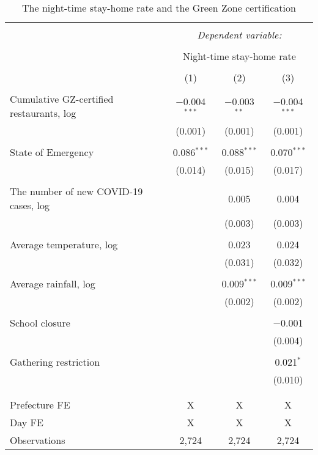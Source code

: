 
\begin{table}[H] \centering 
  \caption{The night-time stay-home rate and the Green Zone certification} 
  \label{} 
\footnotesize 
\begin{tabular}{@{\extracolsep{1pt}}lccc} 
\\[-1.8ex]\hline 
\hline \\[-1.8ex] 
 & \multicolumn{3}{c}{\textit{Dependent variable:}} \\ 
\cline{2-4} 
\\[-1.8ex] & \multicolumn{3}{c}{Night-time stay-home rate} \\ 
\\[-1.8ex] & (1) & (2) & (3)\\ 
\hline \\[-1.8ex] 
 Cumulative GZ-certified restaurants, log & $-$0.004$^{***}$ & $-$0.003$^{**}$ & $-$0.004$^{***}$ \\ 
  & (0.001) & (0.001) & (0.001) \\ 
  & & & \\ 
 State of Emergency & 0.086$^{***}$ & 0.088$^{***}$ & 0.070$^{***}$ \\ 
  & (0.014) & (0.015) & (0.017) \\ 
  & & & \\ 
 The number of new COVID-19 cases, log &  & 0.005 & 0.004 \\ 
  &  & (0.003) & (0.003) \\ 
  & & & \\ 
 Average temperature, log &  & 0.023 & 0.024 \\ 
  &  & (0.031) & (0.032) \\ 
  & & & \\ 
 Average rainfall, log &  & 0.009$^{***}$ & 0.009$^{***}$ \\ 
  &  & (0.002) & (0.002) \\ 
  & & & \\ 
 School closure &  &  & $-$0.001 \\ 
  &  &  & (0.004) \\ 
  & & & \\ 
 Gathering restriction &  &  & 0.021$^{*}$ \\ 
  &  &  & (0.010) \\ 
  & & & \\ 
\hline \\[-1.8ex] 
Prefecture FE & X & X & X \\ 
Day FE & X & X & X \\ 
Observations & 2,724 & 2,724 & 2,724 \\ 

\end{tabular}
\end{table}
